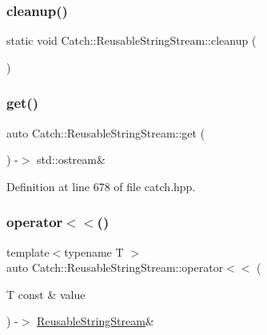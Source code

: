 \subsubsection{\texorpdfstring{cleanup()}{cleanup()}}
{\footnotesize\ttfamily static void Catch\+::\+Reusable\+String\+Stream\+::cleanup (\begin{DoxyParamCaption}{ }\end{DoxyParamCaption})\hspace{0.3cm}{\ttfamily [static]}}

\mbox{\label{class_catch_1_1_reusable_string_stream_a6881808c60a080d4e24a0b81c94cbf67}} 
\subsubsection{\texorpdfstring{get()}{get()}}
{\footnotesize\ttfamily auto Catch\+::\+Reusable\+String\+Stream\+::get (\begin{DoxyParamCaption}{ }\end{DoxyParamCaption}) -\/$>$ std\+::ostream\& \hspace{0.3cm}{\ttfamily [inline]}}



Definition at line 678 of file catch.\+hpp.

\mbox{\label{class_catch_1_1_reusable_string_stream_af95f72024c082db70e5e50782e28e4f6}} 
\subsubsection{\texorpdfstring{operator$<$$<$()}{operator<<()}}
{\footnotesize\ttfamily template$<$typename T $>$ \\
auto Catch\+::\+Reusable\+String\+Stream\+::operator$<$$<$ (\begin{DoxyParamCaption}\item[{T const \&}]{value }\end{DoxyParamCaption}) -\/$>$ \mbox{\hyperlink{class_catch_1_1_reusable_string_stream}{Reusable\+String\+Stream}}\& \hspace{0.3cm}{\ttfamily [inline]}}



